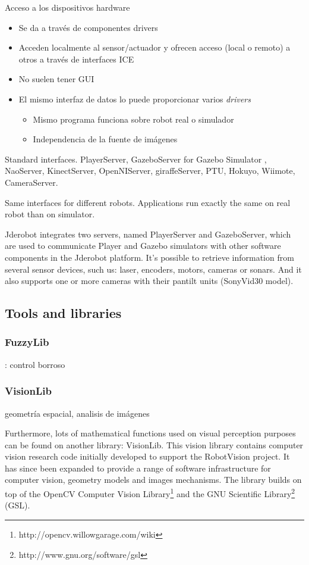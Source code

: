 \documentclass[twocolumn]{svjour3}          %
\begin{document}
Acceso a los dispositivos hardware
\begin{itemize}
\item Se da a través de {componentes drivers}
\item Acceden localmente al sensor/actuador y ofrecen acceso (local o remoto) a otros a través de interfaces ICE
\item No suelen tener GUI
\item El mismo interfaz de datos lo puede proporcionar varios \textit{drivers}
\begin{itemize}
\item Mismo programa funciona sobre robot real o simulador
\item Independencia de la fuente de imágenes
\end{itemize}
\end{itemize}


Standard interfaces. 
PlayerServer, GazeboServer for Gazebo Simulator \cite{koening2004}, NaoServer, KinectServer, OpenNIServer, giraffeServer, PTU, Hokuyo, Wiimote, CameraServer.

Same interfaces for different robots.
Applications run exactly the same on real robot than on simulator. 

Jderobot integrates two servers, named PlayerServer and GazeboServer, which are used to communicate Player and Gazebo simulators with other software components in the Jderobot platform. It's possible to retrieve information from several sensor devices, such us: laser, encoders, motors, cameras or sonars. And it also supports one or more cameras with their pantilt units (SonyVid30 model).

\subsection{Tools and libraries}

\subsubsection{FuzzyLib}: control borroso
\subsubsection{VisionLib}

geometría espacial, analisis de imágenes 

Furthermore, lots of mathematical functions used on visual perception purposes can be found on another library: VisionLib. This vision library contains computer vision research code initially developed to support the RobotVision project. It has since been expanded to provide a range of software infrastructure for computer vision, geometry models and images mechanisms. The library builds on top of the OpenCV Computer Vision Library\footnote{http://opencv.willowgarage.com/wiki} and the GNU Scientific Library\footnote{http://www.gnu.org/software/gsl} (GSL). 
\end{document}
